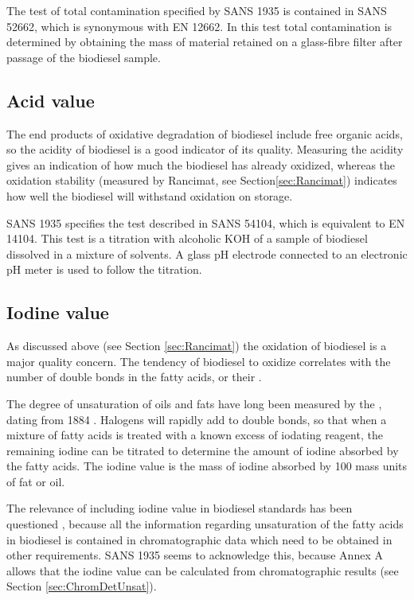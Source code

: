 The test of total contamination specified by SANS 1935 is contained in SANS
52662, which is synonymous with EN 12662. In this test total contamination is
determined by obtaining the mass of material retained on a glass-fibre filter
after passage of the biodiesel sample.

\subsection{Acid value}

The end products of oxidative degradation of biodiesel include free organic acids, so the
acidity of biodiesel is a good indicator of its quality. Measuring the acidity
gives an indication of how much the biodiesel has already oxidized, whereas the
oxidation stability (measured by Rancimat, see Section\ref{sec:Rancimat})
indicates how well the biodiesel will withstand oxidation on storage.

SANS 1935 specifies the test described in SANS 54104, which is equivalent to EN
14104. This test is a titration with alcoholic KOH of a sample of biodiesel
dissolved in a mixture of solvents. A glass pH electrode connected to an
electronic pH meter is used to follow the titration.

\subsection{Iodine value}

As discussed above (see Section \ref{sec:Rancimat}) the oxidation of biodiesel
is a major quality concern. The tendency of biodiesel to oxidize correlates with
the number of double bonds in the fatty acids, or their .


The degree of unsaturation of oils and fats have long been measured by the
, dating from 1884 \autocite{Knothe2007}. Halogens will
rapidly add to double bonds, so that when a mixture of fatty acids is treated
with a known excess of iodating reagent, the remaining iodine can be titrated to
determine the amount of iodine absorbed by the fatty acids. The iodine value is
the mass of iodine absorbed by 100 mass units of fat or oil.

The relevance of including iodine value in biodiesel standards has been
questioned \autocite{Knothe2002}, because all the information regarding
unsaturation of the fatty acids in biodiesel is contained in chromatographic
data which need to be obtained in other requirements. SANS 1935 seems to
acknowledge this, because Annex A allows that the iodine value can be calculated
from chromatographic results (see Section \ref{sec:ChromDetUnsat}).

